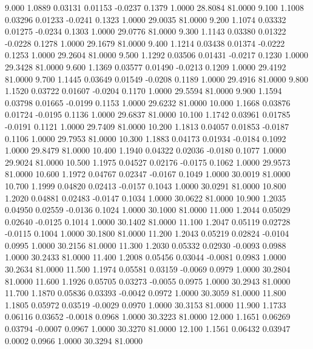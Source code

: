    9.000   1.0889   0.03131   0.01153  -0.0237   0.1379   1.0000  28.8084  81.0000
   9.100   1.1008   0.03296   0.01233  -0.0241   0.1323   1.0000  29.0035  81.0000
   9.200   1.1074   0.03332   0.01275  -0.0234   0.1303   1.0000  29.0776  81.0000
   9.300   1.1143   0.03380   0.01322  -0.0228   0.1278   1.0000  29.1679  81.0000
   9.400   1.1214   0.03438   0.01374  -0.0222   0.1253   1.0000  29.2604  81.0000
   9.500   1.1292   0.03506   0.01431  -0.0217   0.1230   1.0000  29.3428  81.0000
   9.600   1.1369   0.03577   0.01490  -0.0213   0.1209   1.0000  29.4192  81.0000
   9.700   1.1445   0.03649   0.01549  -0.0208   0.1189   1.0000  29.4916  81.0000
   9.800   1.1520   0.03722   0.01607  -0.0204   0.1170   1.0000  29.5594  81.0000
   9.900   1.1594   0.03798   0.01665  -0.0199   0.1153   1.0000  29.6232  81.0000
  10.000   1.1668   0.03876   0.01724  -0.0195   0.1136   1.0000  29.6837  81.0000
  10.100   1.1742   0.03961   0.01785  -0.0191   0.1121   1.0000  29.7409  81.0000
  10.200   1.1813   0.04057   0.01853  -0.0187   0.1106   1.0000  29.7953  81.0000
  10.300   1.1883   0.04173   0.01934  -0.0184   0.1092   1.0000  29.8479  81.0000
  10.400   1.1940   0.04322   0.02036  -0.0180   0.1077   1.0000  29.9024  81.0000
  10.500   1.1975   0.04527   0.02176  -0.0175   0.1062   1.0000  29.9573  81.0000
  10.600   1.1972   0.04767   0.02347  -0.0167   0.1049   1.0000  30.0019  81.0000
  10.700   1.1999   0.04820   0.02413  -0.0157   0.1043   1.0000  30.0291  81.0000
  10.800   1.2020   0.04881   0.02483  -0.0147   0.1034   1.0000  30.0622  81.0000
  10.900   1.2035   0.04950   0.02559  -0.0136   0.1024   1.0000  30.1000  81.0000
  11.000   1.2044   0.05029   0.02640  -0.0125   0.1014   1.0000  30.1402  81.0000
  11.100   1.2047   0.05119   0.02728  -0.0115   0.1004   1.0000  30.1800  81.0000
  11.200   1.2043   0.05219   0.02824  -0.0104   0.0995   1.0000  30.2156  81.0000
  11.300   1.2030   0.05332   0.02930  -0.0093   0.0988   1.0000  30.2433  81.0000
  11.400   1.2008   0.05456   0.03044  -0.0081   0.0983   1.0000  30.2634  81.0000
  11.500   1.1974   0.05581   0.03159  -0.0069   0.0979   1.0000  30.2804  81.0000
  11.600   1.1926   0.05705   0.03273  -0.0055   0.0975   1.0000  30.2943  81.0000
  11.700   1.1870   0.05836   0.03393  -0.0042   0.0972   1.0000  30.3059  81.0000
  11.800   1.1805   0.05972   0.03519  -0.0029   0.0970   1.0000  30.3153  81.0000
  11.900   1.1733   0.06116   0.03652  -0.0018   0.0968   1.0000  30.3223  81.0000
  12.000   1.1651   0.06269   0.03794  -0.0007   0.0967   1.0000  30.3270  81.0000
  12.100   1.1561   0.06432   0.03947   0.0002   0.0966   1.0000  30.3294  81.0000
